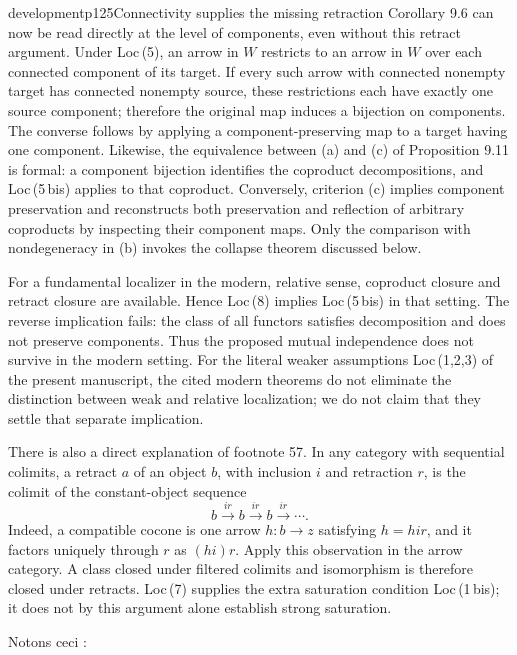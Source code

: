 \begin{dcomment}{development}{p125}{Connectivity supplies the missing retraction}
Corollary 9.6 can now be read directly at the level of components, even without this retract argument. Under Loc\,(5), an arrow in $W$ restricts to an arrow in $W$ over each connected component of its target. If every such arrow with connected nonempty target has connected nonempty source, these restrictions each have exactly one source component; therefore the original map induces a bijection on components. The converse follows by applying a component-preserving map to a target having one component. Likewise, the equivalence between (a) and (c) of Proposition 9.11 is formal: a component bijection identifies the coproduct decompositions, and Loc\,(5\,bis) applies to that coproduct. Conversely, criterion (c) implies component preservation and reconstructs both preservation and reflection of arbitrary coproducts by inspecting their component maps. Only the comparison with nondegeneracy in (b) invokes the collapse theorem discussed below.

For a fundamental localizer in the modern, relative sense, coproduct closure and retract closure are available. Hence Loc\,(8) implies Loc\,(5\,bis) in that setting. The reverse implication fails: the class of all functors satisfies decomposition and does not preserve components. Thus the proposed mutual independence does not survive in the modern setting. For the literal weaker assumptions Loc\,(1,2,3) of the present manuscript, the cited modern theorems do not eliminate the distinction between weak and relative localization; we do not claim that they settle that separate implication.

There is also a direct explanation of footnote 57. In any category with sequential colimits, a retract $a$ of an object $b$, with inclusion $i$ and retraction $r$, is the colimit of the constant-object sequence
\[
 b\xrightarrow{ir}b\xrightarrow{ir}b\xrightarrow{ir}\cdots.
\]
Indeed, a compatible cocone is one arrow $h:b\longrightarrow z$ satisfying $h=hir$, and it factors uniquely through $r$ as $(hi)r$. Apply this observation in the arrow category. A class closed under filtered colimits and isomorphism is therefore closed under retracts. Loc\,(7) supplies the extra saturation condition Loc\,(1\,bis); it does not by this argument alone establish strong saturation.
\end{dcomment}


Notons ceci :

